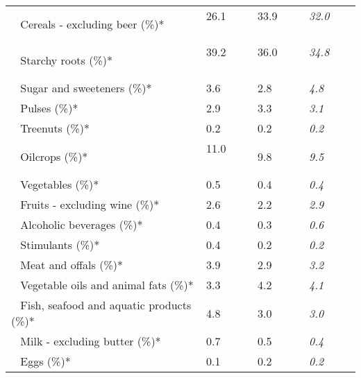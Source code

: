 \begin{tabular}{L{3.9cm} R{1cm} R{1cm} R{1cm}}
	 ~ Cereals - excluding beer (\%)* & 26.1 ~ \ \ & 33.9 ~ \ \ & \textit{32.0} ~ \ \ \\ 
	 ~ Starchy roots (\%)* & 39.2 ~ \ \ & 36.0 ~ \ \ & \textit{34.8} ~ \ \ \\ 
	 ~ Sugar and sweeteners (\%)* & 3.6 ~ \ \ & 2.8 ~ \ \ & \textit{4.8} ~ \ \ \\ 
	 ~ Pulses (\%)* & 2.9 ~ \ \ & 3.3 ~ \ \ & \textit{3.1} ~ \ \ \\ 
	 ~ Treenuts (\%)* & 0.2 ~ \ \ & 0.2 ~ \ \ & \textit{0.2} ~ \ \ \\ 
	 ~ Oilcrops (\%)* & 11.0 ~ \ \ & 9.8 ~ \ \ & \textit{9.5} ~ \ \ \\ 
	 ~ Vegetables (\%)* & 0.5 ~ \ \ & 0.4 ~ \ \ & \textit{0.4} ~ \ \ \\ 
	 ~ Fruits - excluding wine (\%)* & 2.6 ~ \ \ & 2.2 ~ \ \ & \textit{2.9} ~ \ \ \\ 
	 ~ Alcoholic beverages (\%)* & 0.4 ~ \ \ & 0.3 ~ \ \ & \textit{0.6} ~ \ \ \\ 
	 ~ Stimulants (\%)* & 0.4 ~ \ \ & 0.2 ~ \ \ & \textit{0.2} ~ \ \ \\ 
	 ~ Meat and offals (\%)* & 3.9 ~ \ \ & 2.9 ~ \ \ & \textit{3.2} ~ \ \ \\ 
	 ~ Vegetable oils and animal fats (\%)* & 3.3 ~ \ \ & 4.2 ~ \ \ & \textit{4.1} ~ \ \ \\ 
	 ~ Fish, seafood and aquatic products (\%)* & 4.8 ~ \ \ & 3.0 ~ \ \ & \textit{3.0} ~ \ \ \\ 
	 ~ Milk - excluding butter (\%)* & 0.7 ~ \ \ & 0.5 ~ \ \ & \textit{0.4} ~ \ \ \\ 
	 ~ Eggs (\%)* & 0.1 ~ \ \ & 0.2 ~ \ \ & \textit{0.2} ~ \ \ \\ 
       \toprule
      \end{tabular}
      \clearpage
{}
